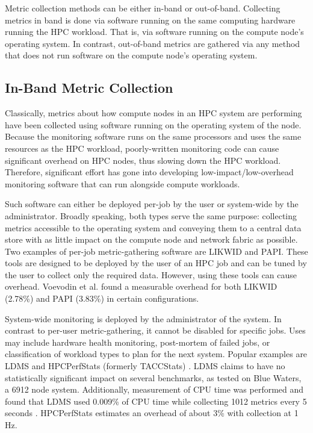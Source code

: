 \documentclass[conference]{IEEEtran}
\begin{document}
Metric collection methods can be either in-band or out-of-band.
Collecting metrics in band is done via software running on the same computing 
hardware running the HPC workload. That is, via software running on the compute 
node's operating system. In contrast, out-of-band metrics are gathered via any 
method that does not run software on the compute node's operating system.

\subsection{In-Band Metric Collection}
Classically, metrics about how compute nodes in an HPC system are performing 
have been collected using software running on the operating system of the node. 
Because the monitoring software runs on the same processors and uses the same 
resources as the HPC workload, 
poorly-written monitoring code can cause significant overhead on HPC nodes, thus slowing 
down the HPC workload. 
Therefore, significant effort has gone into developing low-impact/low-overhead
monitoring software that can run alongside compute workloads\cite{evansComprehensiveResourceUse2014,liMonSTerOutoftheBoxMonitoring2020,agelastosLightweightDistributedMetric2014}.

Such software can either be deployed per-job by the user or system-wide by the 
administrator. Broadly speaking, both types serve 
the same purpose: collecting metrics accessible to the operating 
system and conveying them to a 
central data store with as little impact on the compute node and network fabric 
as possible.
Two examples of per-job metric-gathering software are LIKWID\cite{gruberLIKWID2024}
and PAPI\cite{mucciPAPIPortableInterface}. These tools are designed to be 
deployed by the user of an HPC job and can be tuned by the user to 
collect only the required data. However, using these tools can cause overhead.
Voevodin et al.\cite{voevodinOverheadAnalysisPerformance2022} found a measurable 
overhead for both LIKWID (2.78\%) and PAPI (3.83\%) in certain configurations.

System-wide monitoring is deployed by the administrator of the system. In 
contrast to per-user metric-gathering, it cannot be disabled for specific jobs. 
Uses may include hardware health monitoring, post-mortem of failed jobs, or 
classification of workload types to plan for the next system. Popular examples 
are LDMS\cite{agelastosLightweightDistributedMetric2014} and HPCPerfStats
(formerly TACCStats)
\cite{evansComprehensiveResourceUse2014,TACCHPCPerfStats2026}. 
 LDMS claims to have no statistically significant impact on several 
benchmarks\cite{agelastosLightweightDistributedMetric2014}, as tested on Blue Waters,
a 6912 
node system. Additionally, measurement of CPU time was performed and found that 
LDMS used 0.009\% of CPU time while collecting 1012 metrics every 5 seconds
\cite{brandtHighFidelityData}. HPCPerfStats estimates an overhead of about 3\% 
with collection at 1 Hz\cite{TACCHPCPerfStats2026}.
\end{document}
